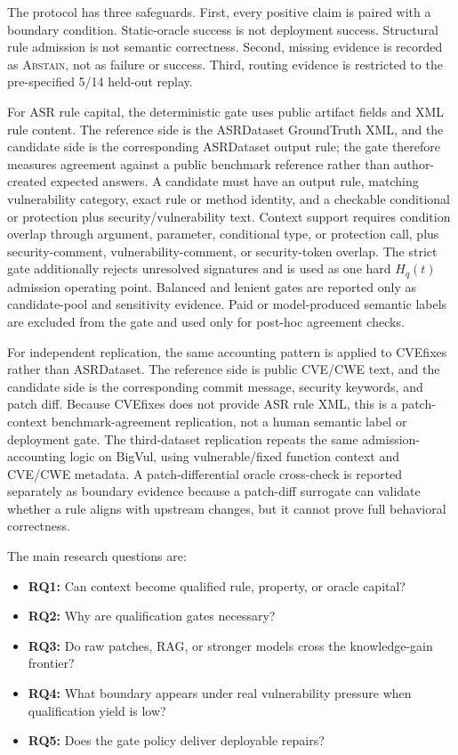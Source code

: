 ﻿\documentclass[lettersize,journal]{IEEEtran}
\begin{document}
The protocol has three safeguards. First, every positive claim is paired with a boundary condition. Static-oracle success is not deployment success. Structural rule admission is not semantic correctness. Second, missing evidence is recorded as \textsc{Abstain}, not as failure or success. Third, routing evidence is restricted to the pre-specified 5/14 held-out replay.

For ASR rule capital, the deterministic gate uses public artifact fields and XML rule content. The reference side is the ASRDataset GroundTruth XML, and the candidate side is the corresponding ASRDataset output rule; the gate therefore measures agreement against a public benchmark reference rather than author-created expected answers. A candidate must have an output rule, matching vulnerability category, exact rule or method identity, and a checkable conditional or protection plus security/vulnerability text. Context support requires condition overlap through argument, parameter, conditional type, or protection call, plus security-comment, vulnerability-comment, or security-token overlap. The strict gate additionally rejects unresolved signatures and is used as one hard $H_q(t)$ admission operating point. Balanced and lenient gates are reported only as candidate-pool and sensitivity evidence. Paid or model-produced semantic labels are excluded from the gate and used only for post-hoc agreement checks.

For independent replication, the same accounting pattern is applied to CVEfixes rather than ASRDataset. The reference side is public CVE/CWE text, and the candidate side is the corresponding commit message, security keywords, and patch diff. Because CVEfixes does not provide ASR rule XML, this is a patch-context benchmark-agreement replication, not a human semantic label or deployment gate. The third-dataset replication repeats the same admission-accounting logic on BigVul, using vulnerable/fixed function context and CVE/CWE metadata. A patch-differential oracle cross-check is reported separately as boundary evidence because a patch-diff surrogate can validate whether a rule aligns with upstream changes, but it cannot prove full behavioral correctness.

The main research questions are:
\begin{itemize}
    \item \textbf{RQ1:} Can context become qualified rule, property, or oracle capital?
    \item \textbf{RQ2:} Why are qualification gates necessary?
    \item \textbf{RQ3:} Do raw patches, RAG, or stronger models cross the knowledge-gain frontier?
    \item \textbf{RQ4:} What boundary appears under real vulnerability pressure when qualification yield is low?
    \item \textbf{RQ5:} Does the gate policy deliver deployable repairs?
\end{itemize}
\end{document}
